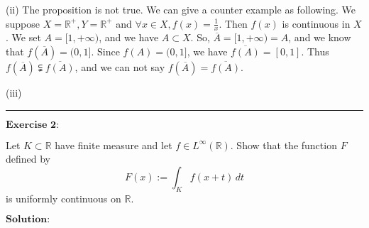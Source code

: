 \documentclass[12pt,a4paper]{ctexart}
\begin{document}
(ii) The proposition is not true. We can give a counter example as following. We suppose $X = \mathbb{R}^{+}, Y = \mathbb{R}^{+}$ and $\forall x \in X, f(x) = \frac{1}{x}$. Then $f(x)$ is continuous in $X$. We set $A = [1, + \infty)$, and we have $A \subset X$. So, $\overline{A} = [1, + \infty) = A$, and we know that $f(\overline{A}) = (0, 1]$. Since $f(A) = (0, 1]$, we have $\overline{f(A)} = [0, 1]$. Thus $f(\overline{A}) \subsetneqq \overline{f(A)}$, and we can not say $f(\overline{A}) = \overline{f(A)}$.

(iii)


\noindent\rule[0.25\baselineskip]{\textwidth}{0.5pt}

\vspace{8pt}
$\textbf{Exercise 2:}$

Let $K \subset \mathbb{R}$ have finite measure and let $f \in L^{\infty} (\mathbb{R})$. Show that the function $F$ defined by 
\begin{equation*}
   F(x):= \int_{K}^{} f(x + t) \, d t
\end{equation*}
is uniformly continuous on $\mathbb{R}$.

\vspace{8pt}
$\textbf{Solution:}$
\end{document}
